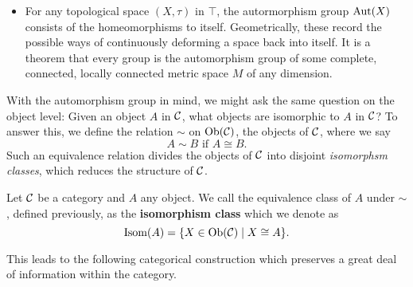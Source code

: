\begin{example}
\begin{itemize}[itemsep=0.5cm]
            \item For any topological space $(X, \tau)$ in $\top$, 
            the autormorphism group $\operatorname{\mathrm{Aut}}(X)$ 
            consists of the homeomorphisms to itself. Geometrically, these record the possible 
            ways of continuously deforming a space back into itself. It is a theorem 
            that every group is the automorphism group of some complete, connected, 
            locally connected metric space $M$ of any dimension.         
        \end{itemize}
    \end{example}


    With the automorphism group in mind, we might ask the same question on the object 
    level:
    Given an object $A$ in $\mathcal{C}$, what objects are isomorphic to $A$ in $\mathcal{C}$?
    To answer this, we define the relation 
    $\sim$ on $\operatorname{\mathrm{Ob}}(\mathcal{C})$, the objects of $\mathcal{C}$, where we say 
    \[
        A \sim B \text{ if } A \cong B.
    \]  
    Such an equivalence relation divides the objects of $\mathcal{C}$ into disjoint 
    \emph{isomorphsm classes}, which reduces the structure of $\mathcal{C}$. 

    \begin{definition}
        Let $\mathcal{C}$ be a category and $A$ any object. We call the equivalence class 
        of $A$ under $\sim$, defined previously, as the \textbf{isomorphism class} 
        which we denote as 
        \[
            \text{Isom}(A) = \{X \in \operatorname{\mathrm{Ob}}(\mathcal{C}) \mid X \cong A\}.
        \]
    \end{definition}

    This leads to the following categorical construction which preserves a great 
    deal of information within the category.

